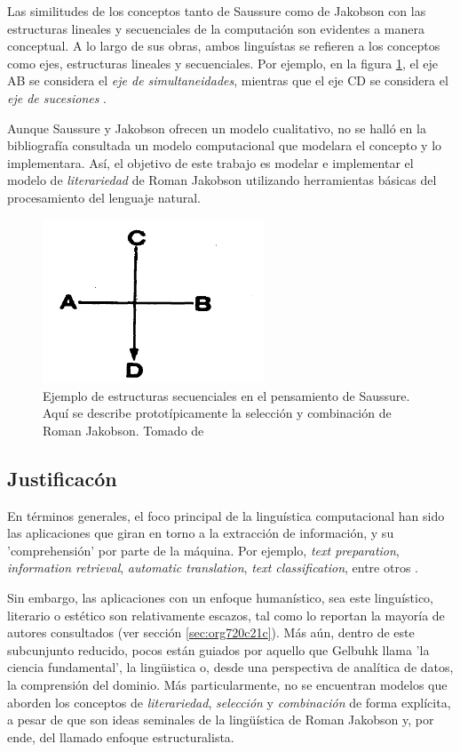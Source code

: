\documentclass[12pt,letterpaper,twoside]{article}
\begin{document}
Las similitudes de los conceptos tanto de Saussure como de Jakobson
con las estructuras lineales y secuenciales de la computación son
evidentes a manera conceptual. A lo largo de sus obras, ambos
linguístas se refieren a los conceptos como ejes, estructuras lineales
y secuenciales.  Por ejemplo, en la figura \ref{fig:org6f52a0f}, el eje AB
se considera el \emph{eje de simultaneidades}, mientras que el eje CD se
considera el \emph{eje de sucesiones} \cite[pg. 106]{alonso1945curso}.

Aunque Saussure y Jakobson ofrecen un modelo cualitativo, no se halló
en la bibliografía consultada un modelo computacional que modelara el
concepto y lo implementara. Así, el objetivo de este trabajo es
modelar e implementar el modelo de \emph{literariedad} de Roman Jakobson
utilizando herramientas básicas del procesamiento del lenguaje
natural.


\begin{figure}[htbp]
\centering
\includegraphics[width=250px]{./assets/ejes_saussure.png}
\caption{\label{fig:org6f52a0f}Ejemplo de estructuras secuenciales en el pensamiento de Saussure. Aquí se describe prototípicamente la selección y combinación de Roman Jakobson. Tomado de \cite{alonso1945curso}}
\end{figure}

\subsection{Justificacón}
\label{sec:org024efb2}

En términos generales, el foco principal de la linguística
computacional han sido las aplicaciones que giran en torno a la
extracción de información, y su 'comprehensión' por parte de la
máquina. Por ejemplo, \emph{text preparation}, \emph{information retrieval},
\emph{automatic translation}, \emph{text classification}, entre otros
\cite{gelbukh2004}.

Sin embargo, las aplicaciones con un enfoque humanístico, sea este
linguístico, literario o estético son relativamente escazos, tal como
lo reportan la mayoría de autores consultados (ver sección \ref{sec:org720c21c}).  Más aún, dentro de este subcunjunto reducido, pocos
están guiados por aquello que Gelbuhk llama 'la ciencia fundamental',
la lingüistica o, desde una perspectiva de analítica de datos, la
comprensión del dominio. Más particularmente, no se encuentran modelos
que aborden los conceptos de \emph{literariedad}, \emph{selección} y \emph{combinación}
de forma explícita, a pesar de que son ideas seminales de la lingüística
de Roman Jakobson y, por ende, del llamado enfoque estructuralista.
\end{document}
